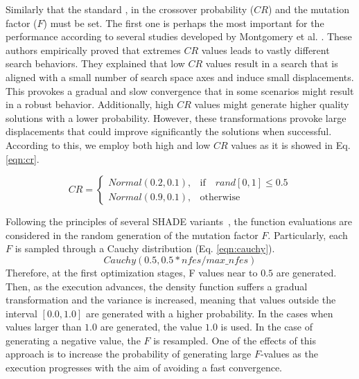 %
Similarly that the standard \DE{}, in \DEEDM{} the crossover probability ($CR$) and the mutation factor ($F$) must be set.
%
The first one is perhaps the most important for the performance according to several studies developed by Montgomery 
et al. \cite{montgomery2010analysis}.
%
These authors empirically proved that extremes $CR$ values leads to vastly different search behaviors.
%
They explained that low $CR$ values result in a search that is aligned with a small number of search space axes and
induce small displacements.
%
This provokes a gradual and slow convergence that in some scenarios might result in a robust behavior.
%
Additionally, high $CR$ values might generate higher quality solutions with a lower probability.
%
However, these transformations provoke large displacements that could improve significantly the solutions when successful.
%
According to this, we employ both high and low $CR$ values as it is showed in Eq. \ref{eqn:cr}.

\begin{equation} \label{eqn:cr}
CR = 
\begin{cases}
     Normal(0.2, 0.1),& \text{if} \quad rand[0,1] \leq 0.5  \\
     Normal(0.9, 0.1),              & \text{otherwise}
\end{cases}
\end{equation}

Following the principles of several SHADE variants~\cite{awad2016ensemble, brest2016shade}, the function evaluations are considered in the random generation of the mutation factor $F$.
%
Particularly, each $F$ is sampled through a Cauchy distribution (Eq. \ref{eqn:cauchy}).
\begin{equation}\label{eqn:cauchy}
 Cauchy(0.5, 0.5*nfes/max\_nfes)
\end{equation}
%
Therefore, at the first optimization stages, F values near to $0.5$ are generated.
%
Then, as the execution advances, the density function suffers a gradual transformation and the variance is increased, meaning
that values outside the interval $[0.0, 1.0]$ are generated with a higher probability.
%
In the cases when values larger than $1.0$ are generated, the value $1.0$ is used.
%
In the case of generating a negative value, the $F$ is resampled.
%
One of the effects of this approach is to increase the probability of generating large $F$-values as the execution progresses
with the aim of avoiding a fast convergence.



